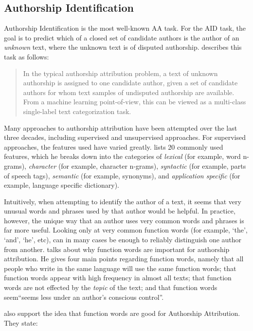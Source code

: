 \subsection{Authorship Identification}
\label{authorship-identification}
Authorship Identification is the most well-known AA task. For the AID task, the goal is to predict which of a closed set of candidate authors is the author of an \textit{unknown} text, where the unknown text is of disputed authorship. \citet{stamatatos2009survey} describes this task as follows:

\begin{quote}
In the typical authorship attribution problem, a text of unknown authorship is assigned to one candidate author, given a set of candidate authors for whom text samples of undisputed authorship are available. From a machine learning point-of-view, this can be viewed as a multi-class single-label text categorization task.
\end{quote}

Many approaches to authorship attribution have been attempted over the last three decades, including supervised and unsupervised approaches. For supervised approaches, the features used have varied greatly. \citet{stamatatos2009survey} lists 20 commonly used features, which he breaks down into the categories of \textit{lexical} (for example, word n-grams), \textit{character} (for example, character n-grams), \textit{syntactic} (for example, parts of speech tags), \textit{semantic} (for example, synonyms), and \textit{application specific} (for example, language specific dictionary). 

Intuitively, when attempting to identify the author of a text, it seems that very unusual words and phrases used by that author would be helpful.  In practice, however, the unique way that an author uses very common words and phrases is far more useful. Looking only at very common function words (for example, `the', `and', `he', etc), can in many cases be enough to reliably distinguish one author from another. \citet{kestemont2014function} talks about why function words are important for authorship attribution. He gives four main points regarding function words, namely that all people who write in the same language will use the same function words; that function words appear with high frequency in almost all texts; that function words are not effected by the \textit{topic} of the text; and that function words seem``seems less under an author’s conscious control''.

\citet{koppel2009computational} also support the idea that function words are good for Authorship Attribution. They state:

